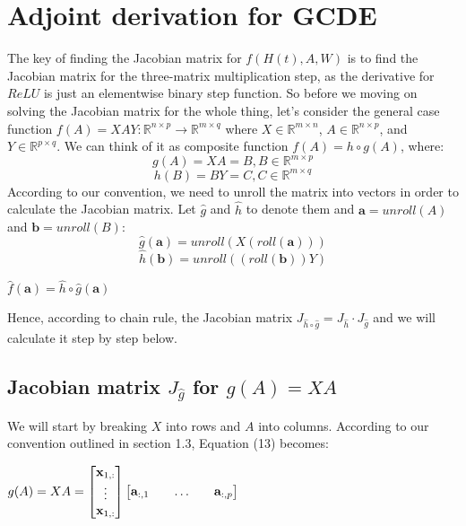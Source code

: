 \documentclass{article}
\begin{document}
\section{Adjoint derivation for GCDE}
The key of finding the Jacobian matrix for $f(H(t), A, W)$ is to find the Jacobian matrix for the three-matrix multiplication step, as the derivative for $ReLU$ is just an elementwise binary step function. So before we moving on solving the Jacobian matrix for the whole thing, let's consider the general case function $f(A) = XAY: \mathbb{R}^{n\times p}  \rightarrow \mathbb{R}^{m\times q}$ where $X\in\mathbb{R}^{m\times n}$, $A\in\mathbb{R}^{n\times p}$, and $Y\in\mathbb{R}^{p\times q}$. We can think of it as composite function $f(A) = h\circ g(A)$, where:
\begin{equation}
    g(A) = XA = B, B\in\mathbb{R}^{m\times p}
\end{equation}
\begin{equation}
h(B) = BY = C, C\in\mathbb{R}^{m\times q}
\end{equation}
According to our convention, we need to unroll the matrix into vectors in order to calculate the Jacobian matrix. Let $\widehat{g}$ and $\widehat{h}$ to denote them and $\mathbf{a} = unroll(A)$ and $\mathbf{b} = unroll(B)$:
\begin{equation}
\widehat{g}(\mathbf{a}) = unroll(X(roll(\mathbf{a})))
\end{equation}
\begin{equation}
\widehat{h}(\mathbf{b}) = unroll((roll(\mathbf{b}))Y)\end{equation}
\begin{center}
    $\widehat{f}(\mathbf{a}) = \widehat{h}\circ\widehat{g}(\mathbf{a})$
\end{center}
Hence, according to chain rule, the Jacobian matrix $J_{\widehat{h}\circ\widehat{g}} = J_{\widehat{h}}\cdot J_{\widehat{g}}$ and we will calculate it step by step below.

\subsection{Jacobian matrix $J_{\widehat{g}}$ for $g(A)=XA$}
We will start by breaking $X$ into rows and $A$ into columns. According to our convention outlined in section 1.3, Equation (13) becomes:

\begin{center}$g(A) = XA = \begin{bmatrix} \mathbf{x}_{1,:} \\ \vdots \\ \mathbf{x}_{1,:} \end{bmatrix} \begin{bmatrix} \mathbf{a}_{:,1} && \hdots && \mathbf{a}_{:,p} \end{bmatrix} \\$
\end{center}
\end{document}
